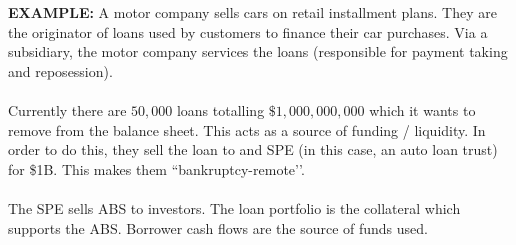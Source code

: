 \documentclass[../notes_compiled.tex]{subfiles}
\begin{document}
\begin{itemize}
{\color{RedViolet}
\item[] \textbf{EXAMPLE:} A motor company sells cars on retail installment plans. They are the originator of loans used by customers to finance their car purchases. Via a subsidiary, the motor company services the loans (responsible for payment taking and reposession). \\ \\
Currently there are $50,000$ loans totalling $\$1,000,000,000$ which it wants to remove from the balance sheet. This acts as a source of funding / liquidity. In order to do this, they sell the loan to and SPE (in this case, an auto loan trust) for \$1B. This makes them ``bankruptcy-remote’’. \\ \\
The SPE sells ABS to investors. The loan portfolio is the collateral which supports the ABS. Borrower cash flows are the source of funds used.
}
\end{itemize}
\end{document}
